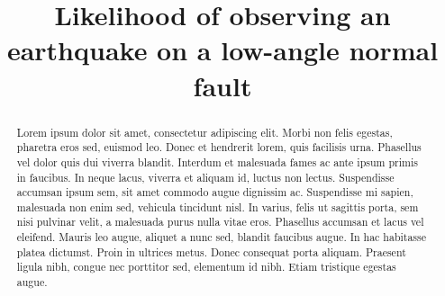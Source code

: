\documentclass[twocolumn,grl]{AGUTeX}
\begin{document}
\title{Likelihood of observing an earthquake on a low-angle normal fault}



\begin{abstract}
Lorem ipsum dolor sit amet, consectetur adipiscing elit. Morbi non felis egestas, pharetra eros sed, euismod leo. Donec et hendrerit lorem, quis facilisis urna. Phasellus vel dolor quis dui viverra blandit. Interdum et malesuada fames ac ante ipsum primis in faucibus. In neque lacus, viverra et aliquam id, luctus non lectus. Suspendisse accumsan ipsum sem, sit amet commodo augue dignissim ac. Suspendisse mi sapien, malesuada non enim sed, vehicula tincidunt nisl. In varius, felis ut sagittis porta, sem nisi pulvinar velit, a malesuada purus nulla vitae eros. Phasellus accumsan et lacus vel eleifend. Mauris leo augue, aliquet a nunc sed, blandit faucibus augue. In hac habitasse platea dictumst. Proin in ultrices metus. Donec consequat porta aliquam. Praesent ligula nibh, congue nec porttitor sed, elementum id nibh. Etiam tristique egestas augue. 
\end{abstract}
\end{document}
